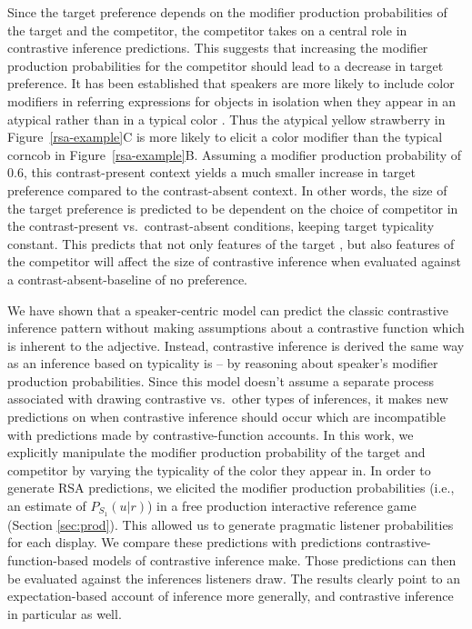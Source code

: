 \documentclass[a4paper,man,floatsintext,natbib]{apa6}
\newcommand{\figref}[1]{Figure~\ref{#1}}
\newcommand{\sectionref}[1]{Section \ref{#1}}
\begin{document}
Since the target preference depends on the modifier production probabilities of the target and the competitor, the competitor takes on a central role in contrastive inference predictions. This suggests that increasing the modifier production probabilities for the competitor should lead to a decrease in target preference. It has been established that speakers are more likely to include color modifiers in referring expressions for objects in isolation when they appear in an atypical rather than in a typical color \citep{Rubio-Fernandez:2016,Westerbeek:2015,Degen:2020}. Thus the atypical yellow strawberry in \figref{rsa-example}C is more likely to elicit a color modifier than the typical corncob in \figref{rsa-example}B. Assuming a modifier production probability of 0.6, this contrast-present context yields a much smaller increase in target preference compared to the contrast-absent context. In other words, the size of the target preference is predicted to be dependent on the choice of competitor in the contrast-present vs.~contrast-absent conditions, keeping target typicality constant. This predicts that not only features of the target \citep{Sedivy:2003, Rubio-Fernandez:2019}, but also features of the competitor will affect the size of contrastive inference when evaluated against a contrast-absent-baseline of no preference.

We have shown that a speaker-centric model can predict the classic contrastive inference pattern without making assumptions about a contrastive function which is inherent to the adjective. Instead, contrastive inference is derived the same way as an inference based on typicality is -- by reasoning about speaker's modifier production probabilities. Since this model doesn't assume a separate process associated with drawing contrastive vs.~other types of inferences, it makes new predictions on when contrastive inference should occur which are incompatible with predictions made by contrastive-function accounts.
In this work, we explicitly manipulate the modifier production probability of the target and competitor by varying the typicality of the color they appear in. In order to generate RSA predictions, we elicited the modifier production probabilities (i.e., an estimate of $P_{S_1}(u|r)$) in a free production interactive reference game (\sectionref{sec:prod}). This allowed us to generate pragmatic listener probabilities for each display. We compare these predictions with predictions contrastive-function-based models of contrastive inference make. Those predictions can then be evaluated against the inferences listeners draw. The results clearly point to an expectation-based account of inference more generally, and contrastive inference in particular as well.
\end{document}

